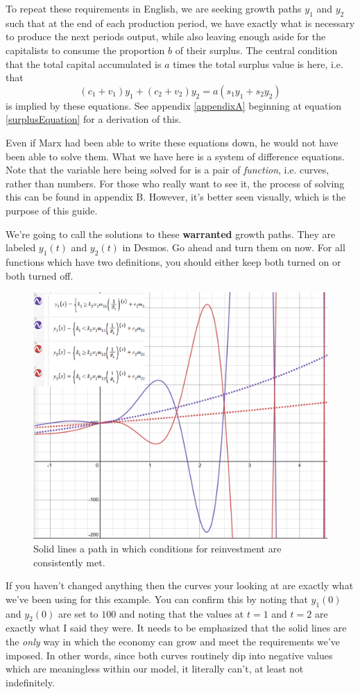 \documentclass{article}
\theoremstyle{theorem}
\begin{document}
To repeat these requirements in English, we are seeking growth paths $y_1$ and $y_2$ such that at the end of each production period, we have exactly what is necessary to produce the next periods output, while also leaving enough aside for the capitalists to consume the proportion $b$ of their surplus. The central condition that the total capital accumulated is $a$ times the total surplus value is here, i.e. that
\[ (c_1+v_1)y_1+(c_2+v_2)y_2=a(s_1y_1+s_2y_2) \]
is implied by these equations. See appendix \ref{appendixA} beginning at equation \ref{surplusEquation} for a derivation of this. \par 
Even if Marx had been able to write these equations down, he would not have been able to solve them. What we have here is a system of difference equations. Note that the variable here being solved for is a pair of \emph{function}, i.e. curves, rather than numbers. For those who really want to see it, the process of solving this can be found in appendix B. However, it's better seen visually, which is the purpose of this guide. \par 
We're going to call the solutions to these \textbf{warranted} growth paths. They are labeled $y_1(t)$ and $y_2(t)$ in Desmos. Go ahead and turn them on now. For all functions which have two definitions, you should either keep both turned on or both turned off.
\begin{figure}[H] 
\centering
\includegraphics[scale=.5]{Images/conditionsP}
\caption{Solid lines a path in which conditions for reinvestment are consistently met.} 
\label{fig:contradiction}
\end{figure}
If you haven't changed anything then the curves your looking at are exactly what we've been using for this example. You can confirm this by noting that $y_1(0)$ and $y_2(0)$ are set to $100$ and noting that the values at $t=1$ and $t=2$ are exactly what I said they were. It needs to be emphasized that the solid lines are the \emph{only} way in which the economy can grow and meet the requirements we've imposed. In other words, since both curves routinely dip into negative values which are meaningless within our model, it literally can't, at least not indefinitely. \par 
\end{document}
